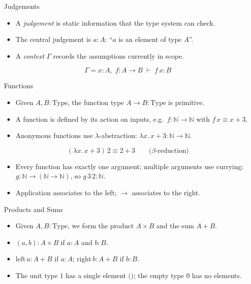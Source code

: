 \documentclass[aspectratio=169,11pt]{beamer}
\begin{document}
\begin{frame}{Judgements}
  \begin{itemize}
    \item A \textit{judgement} is static information that the type system can check.
    \item The central judgement is \(a : A\): ``\(a\) is an element of type \(A\)''.
    \item A \textit{context} \(\Gamma\) records the assumptions currently in scope.
  \end{itemize}

  \vspace{0.4em}
  \[
    \Gamma = x : A,\; f : A \to B \;\vdash\; f\,x : B
  \]
\end{frame}

\begin{frame}{Functions}
  \begin{itemize}
    \item Given \(A, B : \mathrm{Type}\), the function type \(A \to B : \mathrm{Type}\) is primitive.
    \item A function is defined by its action on inputs, e.g.\ \(f : \mathbb{N} \to \mathbb{N}\) with \(f\,x \equiv x + 3\).
    \item Anonymous functions use \(\lambda\)-abstraction: \(\lambda x.\, x + 3 : \mathbb{N} \to \mathbb{N}\).
  \end{itemize}

  \vspace{0.4em}
  \[
    (\lambda x.\, x + 3)\,2 \equiv 2 + 3
    \qquad\text{(\(\beta\)-reduction)}
  \]

  \vspace{0.4em}
  \begin{itemize}
    \item Every function has exactly one argument; multiple arguments use currying:
      \(g : \mathbb{N} \to (\mathbb{N} \to \mathbb{N})\), so \(g\,3\,2 : \mathbb{N}\).
    \item Application associates to the left; \(\to\) associates to the right.
  \end{itemize}
\end{frame}

\begin{frame}{Products and Sums}
  \begin{itemize}
    \item Given \(A, B : \mathrm{Type}\), we form the product \(A \times B\) and the sum \(A + B\).
    \item \((a, b) : A \times B\) if \(a : A\) and \(b : B\).
    \item \(\mathrm{left}\,a : A + B\) if \(a : A\); \(\mathrm{right}\,b : A + B\) if \(b : B\).
    \item The unit type \(1\) has a single element \(\texttt{()}\); the empty type \(0\) has no elements.
  \end{itemize}
\end{frame}
\end{document}
